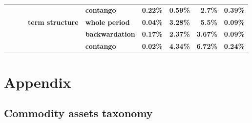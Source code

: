 \documentclass[
  authoryear,
  preprint,
  3p]{elsarticle}
\begin{document}
\begin{longtable}[t]{>{}l>{}l>{}l>{}l>{}l>{}r>{}r>{}r>{}r}
\textbf{} & \textbf{} & \textbf{} & \textbf{} & \textbf{contango} & \textcolor[HTML]{4285f4}{\textbf{0.22\%}} & \textcolor[HTML]{4285f4}{\textbf{0.59\%}} & \textcolor[HTML]{4285f4}{\textbf{2.7\%}} & \textcolor[HTML]{4285f4}{\textbf{0.39\%}}\\
\textbf{} & \textbf{} & \textbf{} & \textbf{term structure} & \textbf{whole period} & \textcolor[HTML]{4285f4}{\textbf{0.04\%}} & \textcolor[HTML]{4285f4}{\textbf{3.28\%}} & \textcolor[HTML]{4285f4}{\textbf{5.5\%}} & \textcolor[HTML]{4285f4}{\textbf{0.09\%}}\\
\textbf{} & \textbf{} & \textbf{} & \textbf{} & \textbf{backwardation} & \textcolor[HTML]{4285f4}{\textbf{0.17\%}} & \textcolor[HTML]{4285f4}{\textbf{2.37\%}} & \textcolor[HTML]{4285f4}{\textbf{3.67\%}} & \textcolor[HTML]{4285f4}{\textbf{0.09\%}}\\
\addlinespace
\textbf{} & \textbf{} & \textbf{} & \textbf{} & \textbf{contango} & \textcolor[HTML]{4285f4}{\textbf{0.02\%}} & \textcolor[HTML]{4285f4}{\textbf{4.34\%}} & \textcolor[HTML]{4285f4}{\textbf{6.72\%}} & \textcolor[HTML]{4285f4}{\textbf{0.24\%}}\\
\bottomrule

\end{longtable}

\endgroup{}

\restoregeometry

\newpage

\section*{Appendix}\label{appendix}

\subsection{Commodity assets taxonomy}\label{sec-taxonomy}

\begingroup\fontsize{7}{9}\selectfont
\end{document}
